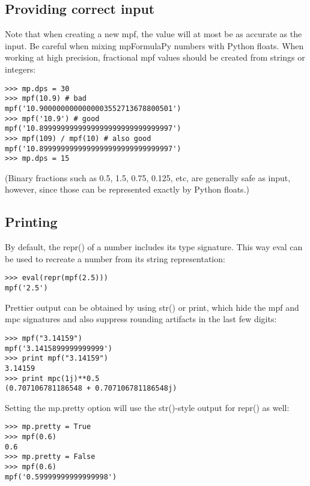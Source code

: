 \subsection{Providing correct input}  

Note that when creating a new mpf, the value will at most be as accurate as the input. Be careful when mixing mpFormulaPy numbers with Python floats. When working at high precision, fractional mpf values should be created from strings or integers:

\begin{lstlisting}
>>> mp.dps = 30
>>> mpf(10.9) # bad
mpf('10.9000000000000003552713678800501')
>>> mpf('10.9') # good
mpf('10.8999999999999999999999999999997')
>>> mpf(109) / mpf(10) # also good
mpf('10.8999999999999999999999999999997')
>>> mp.dps = 15
\end{lstlisting}


(Binary fractions such as 0.5, 1.5, 0.75, 0.125, etc, are generally safe as input, however, since those can be represented exactly by Python floats.)


\subsection{Printing}  

By default, the repr() of a number includes its type signature. This way eval can be used to recreate a number from its string representation:

\begin{lstlisting}
>>> eval(repr(mpf(2.5)))
mpf('2.5')
\end{lstlisting}


Prettier output can be obtained by using str() or print, which hide the mpf and mpc signatures and also suppress rounding artifacts in the last few digits:

\begin{lstlisting}
>>> mpf("3.14159")
mpf('3.1415899999999999')
>>> print mpf("3.14159")
3.14159
>>> print mpc(1j)**0.5
(0.707106781186548 + 0.707106781186548j)
\end{lstlisting}


Setting the mp.pretty option will use the str()-style output for repr() as well:

\begin{lstlisting}
>>> mp.pretty = True
>>> mpf(0.6)
0.6
>>> mp.pretty = False
>>> mpf(0.6)
mpf('0.59999999999999998')
\end{lstlisting}


